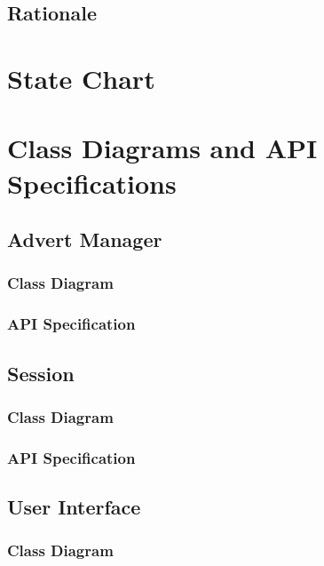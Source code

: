 \documentclass[12pt]{article}
\begin{document}
\subsection{Rationale}

\newpage

\section{State Chart}

\newpage

\section{Class Diagrams and API Specifications}

\subsection{Advert Manager}

\subsubsection{Class Diagram}

\subsubsection{API Specification}

\subsection{Session}

\subsubsection{Class Diagram}

\subsubsection{API Specification}

\subsection{User Interface}

\subsubsection{Class Diagram}
\end{document}
